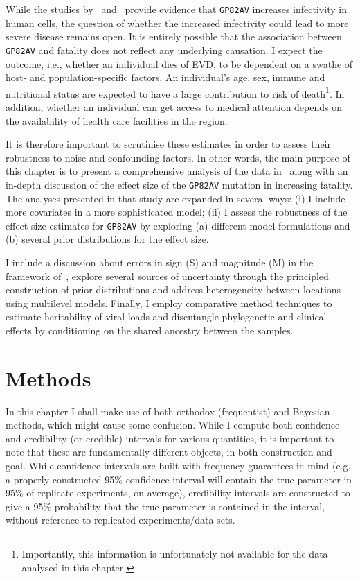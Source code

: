 While the studies by~\cite{Urbanowicz2016} and~\cite{Diehl2016} provide evidence that \verb|GP82AV| increases infectivity in human cells, the question of whether the increased infectivity could lead to more severe disease remains open.
It is entirely possible that the association between \verb|GP82AV| and fatality does not reflect any underlying causation.
I expect the outcome, i.e., whether an individual dies of EVD, to be dependent on a swathe of host- and population-specific factors.
An individual's age, sex, immune and nutritional status are expected to have a large contribution to risk of death\footnote{Importantly, this information is unfortunately not available for the data analysed in this chapter.}.
In addition, whether an individual can get access to medical attention depends on the availability of health care facilities in the region.

It is therefore important to scrutinise these estimates in order to assess their robustness to noise and confounding factors.
In other words, the main purpose of this chapter is to present a comprehensive analysis of the data in~\cite{Diehl2016} along with an in-depth discussion of the effect size of  the \verb|GP82AV| mutation in increasing fatality.
The analyses presented in that study are expanded in several ways: (i) I include more covariates in a more sophisticated model; (ii) I assess the robustness of the effect size estimates for \verb|GP82AV| by exploring (a) different model formulations and (b) several prior distributions for the effect size.

I include a discussion about errors in sign (S) and magnitude (M) in the framework of~\cite{Gelman2014}, explore several sources of uncertainty through the principled construction of prior distributions and address heterogeneity between locations using multilevel models.
Finally, I employ comparative method techniques to estimate heritability of viral loads and disentangle phylogenetic and clinical effects by conditioning on the shared ancestry between the samples.

\section{Methods}

In this chapter I shall make use of both orthodox (frequentist) and Bayesian methods, which might cause some confusion.
While I compute both confidence and credibility (or credible) intervals for various quantities, it is important to note that these are fundamentally different objects, in both construction and goal.
While confidence intervals are built with frequency guarantees in mind (e.g. a properly constructed 95\% confidence interval will contain the true parameter in 95\% of replicate experiments, on average), credibility intervals are constructed to give a 95\% probability that the true parameter is contained in the interval, without reference to replicated experiments/data sets.

